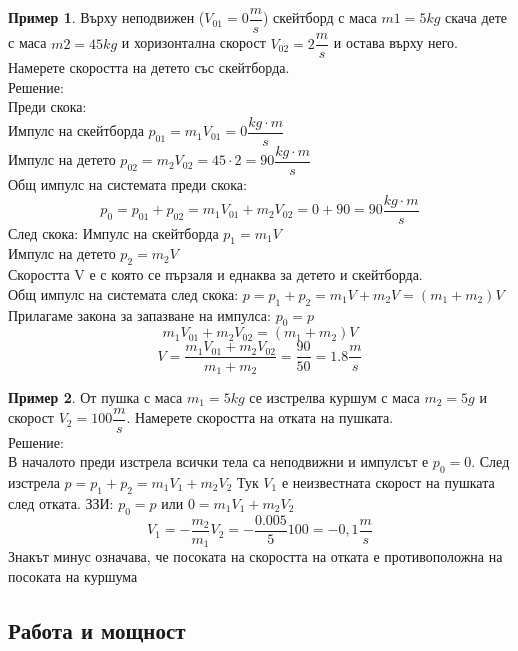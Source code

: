 \documentclass[fleqn, 12pt]{article}
\theoremstyle{definition}
\newtheorem{example}{Пример}[subsection]
\begin{document}
\begin{example}
Върху неподвижен ($V_{01} = 0 \dfrac{m}{s}$) скейтборд с маса $m1 = 5 kg$ скача дете с маса $m2 = 45 kg$ и хоризонтална скорост
$V_{02} = 2 \dfrac{m}{s}$ и остава върху него. Намерете скоростта на детето със скейтборда.\\
Решение: \\
Преди скока:\\
Импулс на скейтборда $p_{01} = m_1 V_{01} = 0 \dfrac{kg \cdot m}{s}$ \\
Импулс на детето $p_{02} = m_2 V_{02} = 45 \cdot 2 = 90 \dfrac{kg \cdot m}{s} $ \\
Общ импулс на системата преди скока:
$$p_0 = p_{01} + p_{02} = m_1 V_{01} + m_2 V_{02} = 0 + 90 = 90 \dfrac{kg \cdot m}{s}$$
След скока:  
Импулс на скейтборда $p_1 = m_1 V $ \\
Импулс на детето $p_2 = m_2 V $\\
Скоростта V е с която се пързаля и еднаква за детето и скейтборда. \\
Общ импулс на системата след скока: $p = p_1 + p_2 = m_1 V +  m_2 V  = (m_1 + m_2)V$ \\
Прилагаме закона за запазване на импулса: $p_0 = p$
$$m_1 V_{01} + m_2 V_{02} = (m_1 + m_2)V $$
$$V = \dfrac{m_1 V_{01} + m_2 V_{02}}{m_1 + m_2} = \dfrac{90}{50} = 1.8 \dfrac{m}{s}$$

\end{example}

\begin{example}
От пушка с маса $m_1 = 5 kg$ се изстрелва куршум с маса $m_2 = 5 g$ и скорост $V_2 = 100 \dfrac{m}{s}$. Намерете скоростта на отката на пушката. \\
Решение: \\
В началото преди изстрела всички тела са неподвижни и импулсът е $p_0 = 0$. След изстрела $p = p_1 + p_2 = m_1V_1 + m_2V_2$ Тук $V_1$ е неизвестната скорост на пушката след отката. 
ЗЗИ: $p_0 = p$ или $0 =m_1V_1 + m_2V_2$
$$V_1 = -\dfrac{m_2}{m_1} V_2 = -\dfrac{0.005}{5} 100 = -0,1 \dfrac{m}{s}$$
Знакът минус означава, че посоката на скоростта на отката е противоположна на посоката на куршума
\end{example}

\subsection{Работа и мощност}
\end{document}
